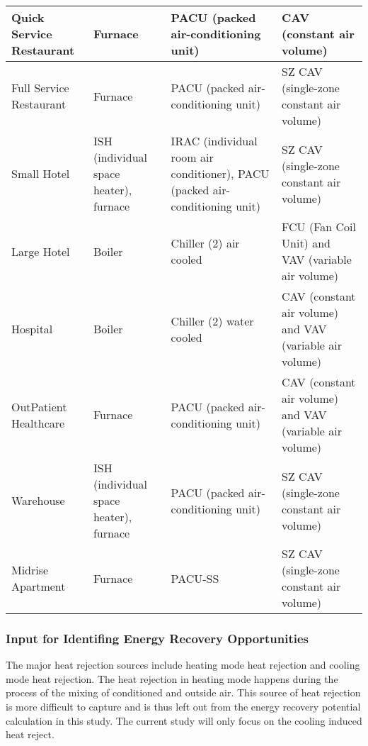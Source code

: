 \begin{table}[h!]
\begin{longtable}{p{2cm}|p{2cm}|p{4cm}|p{4cm}}
  Quick Service Restaurant & Furnace                                & PACU (packed air-conditioning unit)                                         & CAV (constant air volume)                               \\
  \hline
  Full Service Restaurant  & Furnace                                & PACU (packed air-conditioning unit)                                         & SZ CAV (single-zone constant air volume)                \\
  \hline
  Small Hotel              & ISH (individual space heater), furnace & IRAC (individual room air conditioner), PACU (packed air-conditioning unit) & SZ CAV (single-zone constant air volume)                \\
  \hline
  Large Hotel              & Boiler                                 & Chiller (2) air cooled                                                      & FCU (Fan Coil Unit) and VAV (variable air volume)       \\
  \hline
  Hospital                 & Boiler                                 & Chiller (2) water cooled                                                    & CAV (constant air volume) and VAV (variable air volume) \\
  \hline
  OutPatient Healthcare    & Furnace                                & PACU (packed air-conditioning unit)                                         & CAV (constant air volume) and VAV (variable air volume) \\
  \hline
  Warehouse                & ISH (individual space heater), furnace & PACU (packed air-conditioning unit)                                         & SZ CAV (single-zone constant air volume)                \\
  \hline
  Midrise Apartment        & Furnace                                & PACU-SS                                                                     & SZ CAV (single-zone constant air volume)               \\
  \hline
\end{longtable}
\end{table}

\pagebreak
\subsubsection{Input for Identifing Energy Recovery
  Opportunities}\label{sec:inputRecover}
The major heat rejection sources include heating mode heat rejection
and cooling mode heat rejection. The heat rejection in heating mode
happens during the process of the mixing of conditioned and outside
air. This source of heat rejection is more difficult to capture and is
thus left out from the energy recovery potential calculation in this
study. The current study will only focus on the cooling induced heat
reject. 

